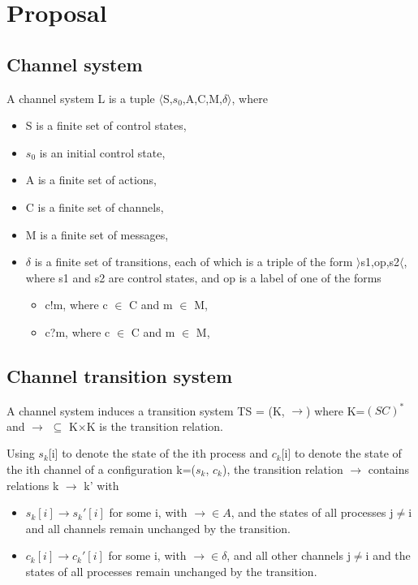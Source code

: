 \documentclass[
10pt, %
a4paper, %
oneside, %
headinclude,footinclude, %
BCOR5mm, %
]{scrartcl}
\begin{document}

\section{Proposal}
\subsection{Channel system}
A channel system L is a tuple $\langle$S,$s_0$,A,C,M,$\delta$$\rangle$, where
\begin{itemize}
\item[]
S is a finite set of control states,
\item[]
$s_0$ is an initial control state,
\item[]
A is a finite set of actions,
\item[]
C is a finite set of channels,
\item[]
M is a finite set of messages,
\item[]
$\delta$ is a finite set of transitions, each of which is a triple of the form $\rangle$s1,op,s2$\langle$, where s1 and s2 are control states, and op is a label of one of the forms

\begin{itemize}
\item
c!m, where c $\in$ C and m $\in$ M,
\item
c?m, where c $\in$ C and m $\in$ M,
\end{itemize}
\end{itemize}

\subsection{Channel transition system}

A channel system induces a transition system TS = (K, $\rightarrow$) where K=$(SC)^*$ and $\rightarrow$ $\subseteq$ K$\times$K is the transition relation.

Using $s_k$[i] to denote the state of the ith process and $c_k$[i] to denote the state of the ith channel of a configuration k=($s_k$, $c_k$), the transition relation $\rightarrow$ contains relations k $\rightarrow$ k' with

\begin{itemize}
  \item
    $s_k[i] \longrightarrow s_k'[i]$ for some i, with $\longrightarrow \in A$, and the states of all processes j$\neq$i and all channels remain unchanged by the transition.
  \item
    $c_k[i] \longrightarrow c_k'[i]$ for some i, with $\longrightarrow \in \delta$, and all other channels j$\neq$i and the states of all processes remain unchanged by the transition.
\end{itemize}
\end{document}
